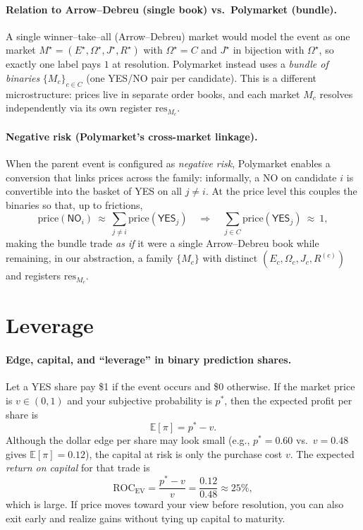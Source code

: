 \paragraph{Relation to Arrow--Debreu (single book) vs.\ Polymarket (bundle).}
A single winner–take–all (Arrow--Debreu) market would model the event as one market $M^\star=(E^\star,\Omega^\star,J^\star,R^\star)$ with
$\Omega^\star=C$ and $J^\star$ in bijection with $\Omega^\star$, so exactly one label pays $1$ at resolution.
Polymarket instead uses a \emph{bundle of binaries} $\{M_c\}_{c\in C}$ (one YES/NO pair per candidate). This is a different microstructure:
prices live in separate order books, and each market $M_c$ resolves independently via its own register $\mathrm{res}_{M_c}$.

\paragraph{Negative risk (Polymarket’s cross-market linkage).}
When the parent event is configured as \emph{negative risk}, Polymarket enables a conversion that links prices across the family:
informally, a \textsf{NO} on candidate $i$ is convertible into the basket of \textsf{YES} on all $j\neq i$.
At the price level this couples the binaries so that, up to frictions,
\[
\mathrm{price}(\textsf{NO}_i)\ \approx\ \sum_{j\neq i}\mathrm{price}(\textsf{YES}_j)
\quad\Longrightarrow\quad
\sum_{j\in C}\mathrm{price}(\textsf{YES}_j)\ \approx\ 1,
\]
making the bundle trade \emph{as if} it were a single Arrow--Debreu book while remaining, in our abstraction, a family $\{M_c\}$ with distinct $(E_c,\Omega_c,J_c,R^{(c)})$ and registers $\mathrm{res}_{M_c}$.


\section{Leverage}

\paragraph{Edge, capital, and “leverage” in binary prediction shares.}
Let a YES share pay \$1 if the event occurs and \$0 otherwise. If the market price is $v\in(0,1)$ and your subjective probability is $p^*$, then the expected profit per share is
\[
\mathbb{E}[\pi]=p^*-v.
\]
Although the dollar edge per share may look small (e.g., $p^*=0.60$ vs.\ $v=0.48$ gives $\mathbb{E}[\pi]=0.12$), the capital at risk is only the purchase cost $v$. The expected \emph{return on capital} for that trade is
\[
\mathrm{ROC}_{\text{EV}}=\frac{p^*-v}{v}=\frac{0.12}{0.48}\approx 25\%,
\]
which is large. If price moves toward your view before resolution, you can also exit early and realize gains without tying up capital to maturity.

